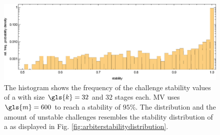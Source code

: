 \begin{figure}[ht]
\includegraphics[width=1.00\textwidth]{images/majority-xor-stability-distribution-simulation.eps}
\caption[Challenge stability distribution of a \mxpuf]{The histogram shows the frequency of the challenge stability values of a \mxpuf with size $\gls{k} = 32$ and $32$ stages each. \ac{MV} uses $\gls{m} = 600$ to reach a stability of $95 \%$. The distribution and the amount of unstable challenges resembles the stability distribution of a \apuf as displayed in Fig. \ref{fig:arbiterstabilitydistribution}.} 
\label{fig:stabilitydistributionmajorityvote}
\end{figure}












